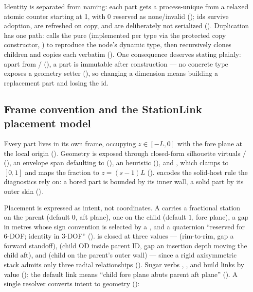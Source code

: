 Identity is separated from naming: each part gets a process-unique  from a relaxed atomic
counter starting at 1, with 0 reserved as none/invalid (); ids
survive adoption, are refreshed on copy, and are deliberately not serialized
(). Duplication has one path:  calls the pure
 (implemented per type via the protected copy constructor,
) to reproduce the node's dynamic type, then recursively clones
children and copies each  verbatim (). One
consequence deserves stating plainly: apart from /
(), a part is immutable after construction --- no concrete type
exposes a geometry setter (), so changing a dimension means
building a replacement part and losing the id.

\subsection{Frame convention and the StationLink placement model}\label{sec:model-placement}

Every part lives in its own \zfwd{} frame, occupying $z \in [-L, 0]$ with the fore plane at the
local origin (). Geometry is exposed through closed-form silhouette
virtuals / (), an
 envelope span defaulting to 
(), an  heuristic (),
and , which clamps to $[0,1]$ and maps the fraction to $z = (s-1)L$
().  encodes the solid-host rule the
diagnostics rely on: a bored part is bounded by its inner wall, a solid part by its outer skin
().

Placement is expressed as intent, not coordinates. A  carries a fractional
station on the parent (default 0, aft plane), one on the child (default 1, fore plane), a gap in
metres whose sign convention is selected by a , and a quaternion 
``reserved for 6-DOF; identity in 3-DOF'' ().  is
closed at three values ---  (rim-to-rim, gap a forward standoff), 
(child OD inside parent ID, gap an insertion depth moving the child aft), and 
(child on the parent's outer wall) --- since a rigid axisymmetric stack admits only three radial
relationships (). Sugar verbs , , and
 build links by value (); the default link
means ``child fore plane abuts parent aft plane'' (). A single
resolver converts intent to geometry ():


